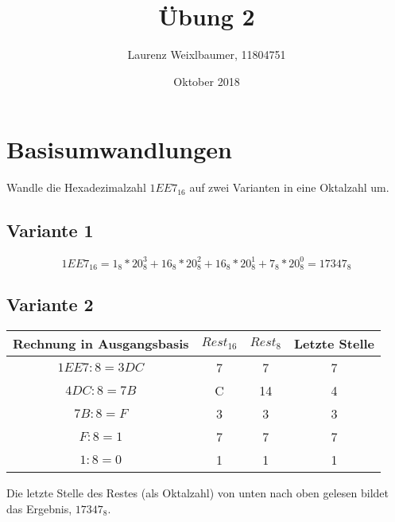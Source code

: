 \documentclass{article}
\title{Übung 2}
\author{Laurenz Weixlbaumer, 11804751}
\date{Oktober 2018}
\begin{document}
\maketitle

\section{Basisumwandlungen}
Wandle die Hexadezimalzahl $1EE7_{16}$ auf zwei Varianten in eine Oktalzahl um.

\subsection{Variante 1}
$$
1EE7_{16} = 1_{8} * 20_{8}^3 + 16_{8} * 20_{8}^2 + 16_{8} * 20_{8}^1 + 7_{8} * 20_{8}^0 = 17347_{8}
$$

\subsection{Variante 2}

\begin{center}
\begin{tabular}{c | c | c | c }
    Rechnung in Ausgangsbasis & $Rest_{16}$ & $Rest_{8}$ & Letzte Stelle\\
    \hline
    $1EE7 : 8 = 3DC$ & 7 & 7 & 7\\
    $4DC : 8 = 7B$ & C & 14 & 4\\
    $7B : 8 = F$ & 3 & 3 & 3\\
    $F : 8 = 1$ & 7 & 7 & 7\\
    $1 : 8 = 0$ & 1 & 1 & 1
\end{tabular}
\end{center}
Die letzte Stelle des Restes (als Oktalzahl) von unten nach oben gelesen bildet das Ergebnis, $17347_{8}$.
\end{document}
